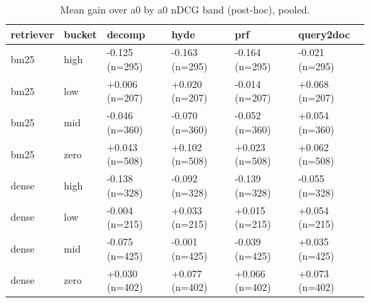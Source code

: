 \begin{table}
\caption{Mean gain over a0 by a0 nDCG band (post-hoc), pooled.}
\label{tab:b-a0}
\begin{tabular}{llllll}
\toprule
retriever & bucket & decomp & hyde & prf & query2doc \\
\midrule
bm25 & high & -0.125 (n=295) & -0.163 (n=295) & -0.164 (n=295) & -0.021 (n=295) \\
bm25 & low & +0.006 (n=207) & +0.020 (n=207) & -0.014 (n=207) & +0.068 (n=207) \\
bm25 & mid & -0.046 (n=360) & -0.070 (n=360) & -0.052 (n=360) & +0.054 (n=360) \\
bm25 & zero & +0.043 (n=508) & +0.102 (n=508) & +0.023 (n=508) & +0.062 (n=508) \\
dense & high & -0.138 (n=328) & -0.092 (n=328) & -0.139 (n=328) & -0.055 (n=328) \\
dense & low & -0.004 (n=215) & +0.033 (n=215) & +0.015 (n=215) & +0.054 (n=215) \\
dense & mid & -0.075 (n=425) & -0.001 (n=425) & -0.039 (n=425) & +0.035 (n=425) \\
dense & zero & +0.030 (n=402) & +0.077 (n=402) & +0.066 (n=402) & +0.073 (n=402) \\
\bottomrule
\end{tabular}
\end{table}
